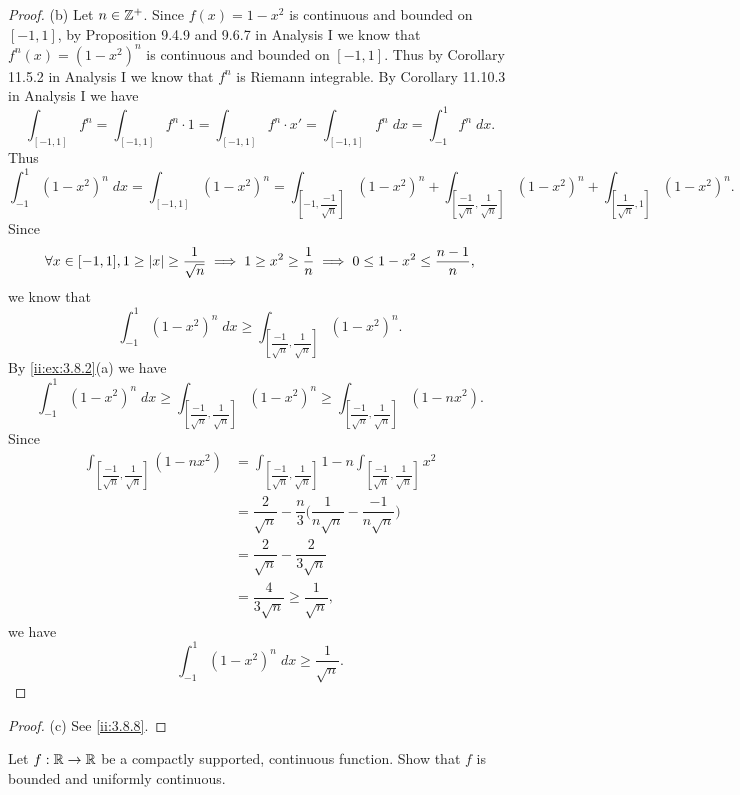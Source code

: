 \begin{proof}{(b)}
  Let \(n \in \mathbb{Z}^+\).
  Since \(f(x) = 1 - x^2\) is continuous and bounded on \([-1, 1]\), by Proposition 9.4.9 and 9.6.7 in Analysis I we know that \(f^n(x) = (1 - x^2)^n\) is continuous and bounded on \([-1, 1]\).
  Thus by Corollary 11.5.2 in Analysis I we know that \(f^n\) is Riemann integrable.
  By Corollary 11.10.3 in Analysis I we have
  \[
    \int_{[-1, 1]} f^n = \int_{[-1, 1]} f^n \cdot 1 = \int_{[-1, 1]} f^n \cdot x' = \int_{[-1, 1]} f^n \; dx = \int_{-1}^1 f^n \; dx.
  \]
  Thus
  \[
    \int_{-1}^1 (1 - x^2)^n \; dx = \int_{[-1, 1]} (1 - x^2)^n = \int_{[-1, \dfrac{-1}{\sqrt{n}}]} (1 - x^2)^n + \int_{[\dfrac{-1}{\sqrt{n}}, \dfrac{1}{\sqrt{n}}]} (1 - x^2)^n + \int_{[\dfrac{1}{\sqrt{n}}, 1]} (1 - x^2)^n.
  \]
  Since
  \[
    \forall x \in [-1, 1], 1 \geq \left\lvert x\right\rvert \geq \dfrac{1}{\sqrt{n}} \implies 1 \geq x^2 \geq \dfrac{1}{n} \implies 0 \leq 1 - x^2 \leq \dfrac{n - 1}{n},
  \]
  we know that
  \[
    \int_{-1}^1 (1 - x^2)^n \; dx \geq \int_{[\dfrac{-1}{\sqrt{n}}, \dfrac{1}{\sqrt{n}}]} (1 - x^2)^n.
  \]
  By \cref{ii:ex:3.8.2}(a) we have
  \[
    \int_{-1}^1 (1 - x^2)^n \; dx \geq \int_{[\dfrac{-1}{\sqrt{n}}, \dfrac{1}{\sqrt{n}}]} (1 - x^2)^n \geq \int_{[\dfrac{-1}{\sqrt{n}}, \dfrac{1}{\sqrt{n}}]} (1 - n x^2).
  \]
  Since
  \begin{align*}
    \int_{[\dfrac{-1}{\sqrt{n}}, \dfrac{1}{\sqrt{n}}]} (1 - n x^2) & = \int_{[\dfrac{-1}{\sqrt{n}}, \dfrac{1}{\sqrt{n}}]} 1 - n \int_{[\dfrac{-1}{\sqrt{n}}, \dfrac{1}{\sqrt{n}}]} x^2 \\
                                                                   & = \dfrac{2}{\sqrt{n}} - \dfrac{n}{3} \bigg(\dfrac{1}{n \sqrt{n}} - \dfrac{-1}{n \sqrt{n}}\bigg)                   \\
                                                                   & = \dfrac{2}{\sqrt{n}} - \dfrac{2}{3 \sqrt{n}}                                                                     \\
                                                                   & = \dfrac{4}{3 \sqrt{n}} \geq \dfrac{1}{\sqrt{n}},
  \end{align*}
  we have
  \[
    \int_{-1}^1 (1 - x^2)^n \; dx \geq \dfrac{1}{\sqrt{n}}.
  \]
\end{proof}

\begin{proof}{(c)}
  See \cref{ii:3.8.8}.
\end{proof}

\begin{ex}\label{ii:ex:3.8.3}
  Let \(f : \mathbb{R} \to \mathbb{R}\) be a compactly supported, continuous function.
  Show that \(f\) is bounded and uniformly continuous.
\end{ex}

